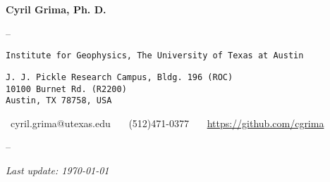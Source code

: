 \begin{center}

{\LARGE \textbf{Cyril Grima, Ph. D.}}
\vspace{.5em}

\hspace{0pt}{\large Research Associate}

--

\noindent\hspace{0pt}\texttt{Institute for Geophysics, The University of Texas at Austin}

\noindent\hspace{0pt}\texttt{J. J. Pickle Research Campus, Bldg. 196 (ROC) \\
10100 Burnet Rd. (R2200) \\
Austin, TX 78758, USA}
\vspace{.5em}

\noindent\hspace{0pt}\faInbox \ cyril.grima@utexas.edu \ \ \faPhone \ (512)471-0377 
\ \ \faGithub \ \href{https://github.com/cgrima}{https://github.com/cgrima}

--

\textit{Last update: \today}

\end{center}
\vspace{-1em}